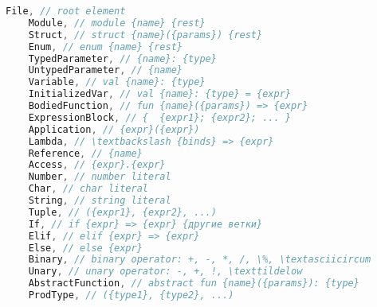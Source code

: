 \begin{lstlisting}[label=lst:nodes, caption={Имена всех элементов, составляющих абстрактное синтаксическое дерево}, language=C]
    File, // root element
    Module, // module {name} {rest}
    Struct, // struct {name}({params}) {rest}
    Enum, // enum {name} {rest}
    TypedParameter, // {name}: {type}
    UntypedParameter, // {name}
    Variable, // val {name}: {type}
    InitializedVar, // val {name}: {type} = {expr}
    BodiedFunction, // fun {name}({params}) => {expr}
    ExpressionBlock, // {  {expr1}; {expr2}; ... }
    Application, // {expr}({expr})
    Lambda, // \textbackslash {binds} => {expr}
    Reference, // {name}
    Access, // {expr}.{expr}
    Number, // number literal
    Char, // char literal
    String, // string literal
    Tuple, // ({expr1}, {expr2}, ...)
    If, // if {expr} => {expr} {другие ветки}
    Elif, // elif {expr} => {expr}
    Else, // else {expr}
    Binary, // binary operator: +, -, *, /, \%, \textasciicircum
    Unary, // unary operator: -, +, !, \texttildelow
    AbstractFunction, // abstract fun {name}({params}): {type}
    ProdType, // ({type1}, {type2}, ...)
\end{lstlisting}